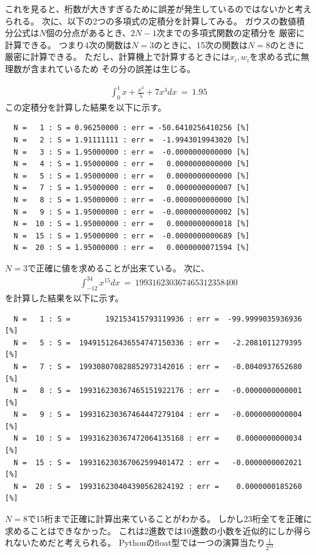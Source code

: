 \documentclass[dvipdfmx]{jsarticle}
\begin{document}
これを見ると、桁数が大きすぎるために誤差が発生しているのではないかと考えられる。
次に、以下の2つの多項式の定積分を計算してみる。
ガウスの数値積分公式は$N$個の分点があるとき、$2N-1$次までの多項式関数の定積分を
厳密に計算できる。
つまり4次の関数は$N=3$のときに、15次の関数は$N=8$のときに厳密に計算できる。
ただし、計算機上で計算するときには$x_i,w_i$を求める式に無理数が含まれているため
その分の誤差は生じる。

\begin{eqnarray}
  \int_{0}^{1} x+\frac{x^3}{5}+7x^4 dx ~=~ 1.95
\end{eqnarray}
この定積分を計算した結果を以下に示す。
\begin{verbatim}
  N =   1 : S = 0.96250000 : err = -50.6410256410256 [%]
  N =   2 : S = 1.91111111 : err =  -1.9943019943020 [%]
  N =   3 : S = 1.95000000 : err =  -0.0000000000000 [%]
  N =   4 : S = 1.95000000 : err =   0.0000000000000 [%]
  N =   5 : S = 1.95000000 : err =   0.0000000000000 [%]
  N =   7 : S = 1.95000000 : err =   0.0000000000007 [%]
  N =   8 : S = 1.95000000 : err =  -0.0000000000000 [%]
  N =   9 : S = 1.95000000 : err =  -0.0000000000002 [%]
  N =  10 : S = 1.95000000 : err =   0.0000000000018 [%]
  N =  15 : S = 1.95000000 : err =  -0.0000000000689 [%]
  N =  20 : S = 1.95000000 : err =   0.0000000071594 [%]
\end{verbatim}
$N=3$で正確に値を求めることが出来ている。
次に、
\begin{eqnarray}
  \int_{-12}^{34} x^{15} dx ~=~ 199316230367465312358400
\end{eqnarray}
を計算した結果を以下に示す。
\begin{verbatim}
  N =   1 : S =        192153415793119936 : err =  -99.9999035936936 [%]
  N =   5 : S =  194915126436554747150336 : err =   -2.2081011279395 [%]
  N =   7 : S =  199308070828852973142016 : err =   -0.0040937652680 [%]
  N =   8 : S =  199316230367465151922176 : err =   -0.0000000000001 [%]
  N =   9 : S =  199316230367464447279104 : err =   -0.0000000000004 [%]
  N =  10 : S =  199316230367472064135168 : err =    0.0000000000034 [%]
  N =  15 : S =  199316230367062599401472 : err =   -0.0000000002021 [%]
  N =  20 : S =  199316230404390562824192 : err =    0.0000000185260 [%]
\end{verbatim}

$N=8$で15桁まで正確に計算出来ていることがわかる。
しかし23桁全てを正確に求めることはできなかった。
これは2進数では10進数の小数を近似的にしか得られないためだと考えられる。
Pythonのfloat型では一つの演算当たり$\displaystyle \frac{1}{2^{53}}$
\end{document}
